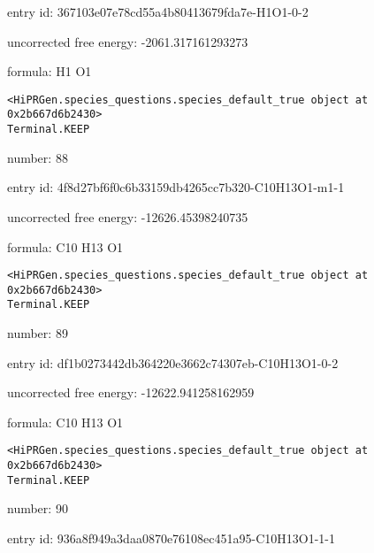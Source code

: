 \documentclass{article}
\begin{document}
entry id: 367103e07e78cd55a4b80413679fda7e-H1O1-0-2



uncorrected free energy: -2061.317161293273



formula: H1 O1


\vspace{1cm}
\begin{verbatim}
<HiPRGen.species_questions.species_default_true object at 0x2b667d6b2430>
Terminal.KEEP
\end{verbatim}


number: 88



entry id: 4f8d27bf6f0c6b33159db4265cc7b320-C10H13O1-m1-1



uncorrected free energy: -12626.45398240735



formula: C10 H13 O1


\vspace{1cm}
\begin{verbatim}
<HiPRGen.species_questions.species_default_true object at 0x2b667d6b2430>
Terminal.KEEP
\end{verbatim}


number: 89



entry id: df1b0273442db364220e3662c74307eb-C10H13O1-0-2



uncorrected free energy: -12622.941258162959



formula: C10 H13 O1


\vspace{1cm}
\begin{verbatim}
<HiPRGen.species_questions.species_default_true object at 0x2b667d6b2430>
Terminal.KEEP
\end{verbatim}


number: 90



entry id: 936a8f949a3daa0870e76108ec451a95-C10H13O1-1-1
\end{document}
